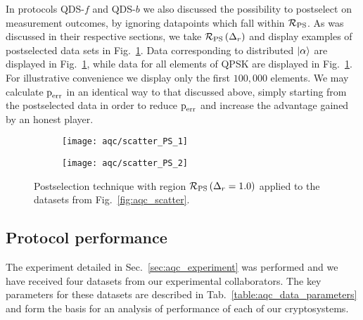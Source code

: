 In protocols QDS-$f$ and QDS-$b$ we also discussed the possibility to postselect on measurement outcomes, by ignoring datapoints which fall within $\mathcal{R}_{\text{PS}}$. As was discussed in their respective sections, we take $\mathcal{R}_{\text{PS}}\left(\Delta_r\right)$ and display examples of postselected data sets in Fig.~\ref{fig:aqc_ps}. Data corresponding to distributed $\ket{\alpha}$ are displayed in Fig.~\ref{fig:aqc_ps}, while data for all elements of QPSK are displayed in Fig.~\ref{fig:aqc_ps}. For illustrative convenience we display only the first $100,000$ elements. We may calculate $\text{p}_{\text{err}}$ in an identical way to that discussed above, simply starting from the postselected data in order to reduce $\text{p}_{\text{err}}$ and increase the advantage gained by an honest player.

\begin{figure}[htp]
\captionsetup{width=\linewidth}
\centering
	\begin{subfigure}{0.49\linewidth}
	\centering
	\texttt{[image: aqc/scatter\_PS\_1]}
	\caption{}
	\end{subfigure}
	\begin{subfigure}{0.49\linewidth}
	\centering
	\texttt{[image: aqc/scatter\_PS\_2]}
	\caption{}
	\end{subfigure}
\caption{\label{fig:aqc_ps} Postselection technique with region $\mathcal{R}_{\text{PS}}\left(\Delta_r=1.0\right)$ applied to the datasets from Fig.~\ref{fig:aqc_scatter}.}
\end{figure}


\FloatBarrier
\subsection{Protocol performance}\label{sec:aqc_performance}
The experiment detailed in Sec.~\ref{sec:aqc_experiment} was  performed and we have received four datasets from our experimental collaborators. The key parameters for these datasets are described in Tab.~\ref{table:aqc_data_parameters} and form the basis for an analysis of performance of each of our cryptosystems.

